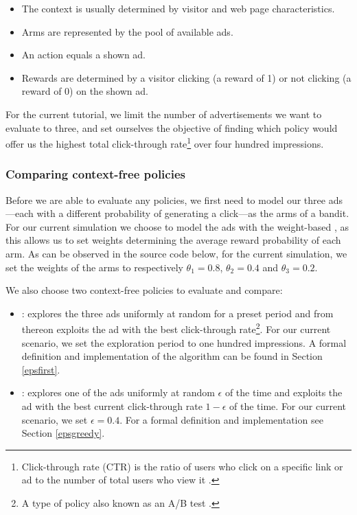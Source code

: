 \documentclass{jss}
\begin{document}
\begin{itemize}
         \item The context is usually determined by visitor and web page characteristics.
         \item Arms are represented by the pool of available ads.
         \item An action equals a shown ad.
         \item Rewards are determined by a visitor clicking (a reward of 1) or not clicking (a reward of 0) on the shown ad.
\end{itemize}

For the current tutorial, we limit the number of advertisements we want to evaluate to three, and set ourselves the objective of finding which policy would offer us the highest total click-through rate\footnote{Click-through rate (CTR) is the ratio of users who click on a specific link or ad to the number of total users who view it \citep{Briggs1997}.} over four hundred impressions.

\subsubsection{Comparing context-free policies} \label{ncp}

Before we are able to evaluate any policies, we first need to model our three ads---each with a different probability of generating a click---as the arms of a bandit. For our current simulation we choose to model the ads with the weight-based , as this allows us to set weights determining the average reward probability of each arm. As can be observed in the source code below, for the current simulation, we set the weights of the arms to respectively $\theta_1 = 0.8$, $\theta_2  = 0.4$ and $\theta_3 = 0.2$.

We also choose two context-free policies to evaluate and compare:

\begin{itemize}
         \item {}: explores the three ads uniformly at random for a preset period and from thereon exploits the ad with the best click-through rate\footnote{A type of policy also known as an A/B test \citep{Kohavi2007}.}. For our current scenario, we set the exploration period to one hundred impressions. A formal definition and implementation of the algorithm can be found in Section \ref{epsfirst}.

         \item {}: explores one of the ads uniformly at random $\epsilon$ of the time and exploits the ad with the best current click-through rate $1 - \epsilon$ of the time. For our current scenario, we set $\epsilon = 0.4$. For a formal definition and implementation see Section \ref{epsgreedy}.
\end{itemize}
\end{document}
